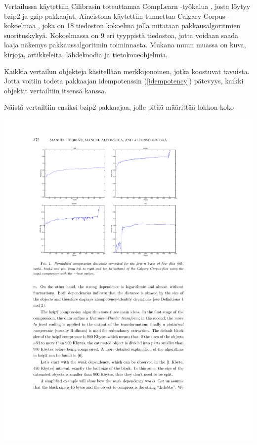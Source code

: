 \documentclass[12pt,finnish,draft]{tktltiki2}
\theoremstyle{definition}
\theoremstyle{remark}
\begin{document}
      Vertailussa käytettiin Cilibrasin toteuttamaa CompLearn -työkalua \cite{complearn}, josta löytyy bzip2 ja gzip pakkaajat. Aineistona käytettiin tunnettua Calgary Corpus -kokoelmaa \cite{calgarycorpus}, joka on 18 tiedoston kokoelma jolla mitataan pakkausalgoritmien suorituskykyä. Kokoelmassa on 9 eri tyyppistä tiedostoa, jotta voidaan saada laaja näkemys pakkaussalgoritmin toiminnasta. Mukana muun muassa on kuva, kirjoja, artikkeleita, lähdekoodia ja tietokoneohjelmia.

      Kaikkia vertailun objekteja käsitellään merkkijonoinen, jotka koostuvat tavuista. Jotta voitiin todeta pakkaajan idempotenssin (\ref{idempotency}) pätevyys, kaikki objektit vertailtiin itsensä kanssa.

      Näistä vertailtiin ensiksi bzip2 pakkaajaa, jolle pitää määrittää lohkon koko

      \immediate{}
      \includegraphics{img/bzip2-best}

\end{document}
